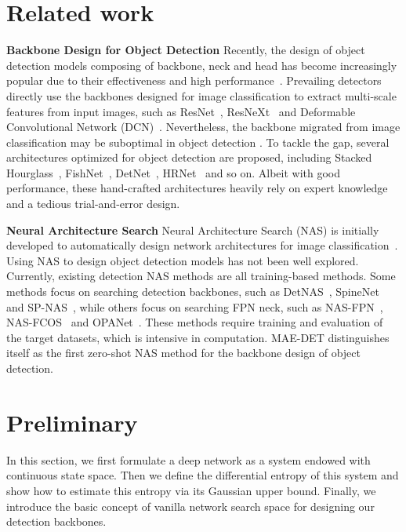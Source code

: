 \documentclass[nohyperref]{article}
\theoremstyle{plain}
\theoremstyle{definition}
\theoremstyle{remark}
\begin{document}
\section{Related work} 
\noindent\textbf{Backbone Design for Object Detection}
Recently, the design of object detection models composing of backbone, neck and head has become increasingly popular due to their effectiveness and high performance~\citep{fpn,retinanet,fcos,gfv1,gfv2,bifpn,giraffedet}.
Prevailing detectors directly use the backbones designed for image classification to extract multi-scale features from input images, such as ResNet~\citep{resnet}, ResNeXt~\citep{resnext} and Deformable Convolutional Network (DCN)~\citep{dcn}.
Nevertheless, the backbone migrated from image classification may be suboptimal in object detection \citep{nasfpn}. 
To tackle the gap, several architectures optimized for object detection are proposed, including Stacked Hourglass~\citep{hourglass}, FishNet~\citep{fishnet}, DetNet~\citep{detnet}, 
HRNet~\citep{hrnet} and so on. Albeit with good performance, these hand-crafted architectures heavily rely on expert knowledge and a tedious trial-and-error design.

\noindent\textbf{Neural Architecture Search} 
Neural Architecture Search (NAS) is initially developed to automatically design network architectures for image classification~\citep{nasnet,darts,abenas,ofa,darts-,mcunet,efficient,autoformer,zennas}. Using NAS to design object detection models has not been well explored. Currently, existing detection NAS methods are all training-based methods. Some methods focus on searching detection backbones, such as DetNAS~\citep{detnas}, SpineNet~\citep{spinenet} and SP-NAS~\citep{spnas}, while others focus on searching FPN neck, such as NAS-FPN~\citep{nasfpn}, NAS-FCOS~\citep{nasfcos} and OPANet~\citep{opanas}. These methods require training and evaluation of the target datasets, which is intensive in computation. MAE-DET distinguishes itself as the first zero-shot NAS method for the backbone design of object detection.

\section{Preliminary}
\label{sec:Preliminary}

In this section, we first formulate a deep network as a system endowed with continuous state space. Then we define the differential entropy of this system and show how to estimate this entropy via its Gaussian upper bound. Finally, we introduce the basic concept of vanilla network search space for designing our detection backbones.
\end{document}
